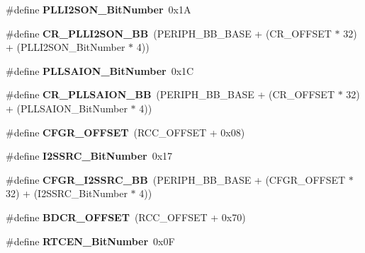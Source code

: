 \begin{DoxyCompactItemize}
\mbox{\label{group___r_c_c_gabae59c3e4200523e3aa5b6e10aee8c46}} 
\#define {\bfseries P\+L\+L\+I2\+S\+O\+N\+\_\+\+Bit\+Number}~0x1A
\item 
\mbox{\label{group___r_c_c_ga0c0fb27aba4eb660f7590252596bdfc5}} 
\#define {\bfseries C\+R\+\_\+\+P\+L\+L\+I2\+S\+O\+N\+\_\+\+BB}~(P\+E\+R\+I\+P\+H\+\_\+\+B\+B\+\_\+\+B\+A\+SE + (C\+R\+\_\+\+O\+F\+F\+S\+ET $\ast$ 32) + (P\+L\+L\+I2\+S\+O\+N\+\_\+\+Bit\+Number $\ast$ 4))
\item 
\mbox{\label{group___r_c_c_ga786a15b370532d6429e03a9f9d226be7}} 
\#define {\bfseries P\+L\+L\+S\+A\+I\+O\+N\+\_\+\+Bit\+Number}~0x1C
\item 
\mbox{\label{group___r_c_c_gab84e7d3874237ee56e5cb3a26644cd13}} 
\#define {\bfseries C\+R\+\_\+\+P\+L\+L\+S\+A\+I\+O\+N\+\_\+\+BB}~(P\+E\+R\+I\+P\+H\+\_\+\+B\+B\+\_\+\+B\+A\+SE + (C\+R\+\_\+\+O\+F\+F\+S\+ET $\ast$ 32) + (P\+L\+L\+S\+A\+I\+O\+N\+\_\+\+Bit\+Number $\ast$ 4))
\item 
\mbox{\label{group___r_c_c_ga8682298330c3b9bae1992e4f1a0af985}} 
\#define {\bfseries C\+F\+G\+R\+\_\+\+O\+F\+F\+S\+ET}~(R\+C\+C\+\_\+\+O\+F\+F\+S\+ET + 0x08)
\item 
\mbox{\label{group___r_c_c_ga9561d436b438d8f513b754f1934c3e30}} 
\#define {\bfseries I2\+S\+S\+R\+C\+\_\+\+Bit\+Number}~0x17
\item 
\mbox{\label{group___r_c_c_ga9076f5ddbb262fd45584702f5d280c9e}} 
\#define {\bfseries C\+F\+G\+R\+\_\+\+I2\+S\+S\+R\+C\+\_\+\+BB}~(P\+E\+R\+I\+P\+H\+\_\+\+B\+B\+\_\+\+B\+A\+SE + (C\+F\+G\+R\+\_\+\+O\+F\+F\+S\+ET $\ast$ 32) + (I2\+S\+S\+R\+C\+\_\+\+Bit\+Number $\ast$ 4))
\item 
\mbox{\label{group___r_c_c_ga5f8a0c3cb5f5c835bf7eef09515138ad}} 
\#define {\bfseries B\+D\+C\+R\+\_\+\+O\+F\+F\+S\+ET}~(R\+C\+C\+\_\+\+O\+F\+F\+S\+ET + 0x70)
\item 
\mbox{\label{group___r_c_c_ga9302c551752124766afc4cee65436405}} 
\#define {\bfseries R\+T\+C\+E\+N\+\_\+\+Bit\+Number}~0x0F
\item 

\end{DoxyCompactItemize}
